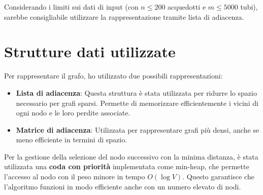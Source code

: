 \documentclass[a4paper,12pt]{article}
\begin{document}
Considerando i limiti sui dati di input (con $n \leq 200$ acquedotti e $m \leq 5000$ tubi), 
sarebbe consigliabile utilizzare la rappresentazione 
tramite lista di adiacenza.

\clearpage

\section{Strutture dati utilizzate}
Per rappresentare il grafo, ho utilizzato due possibili rappresentazioni:
\begin{itemize}
    \item \textbf{Lista di adiacenza}: Questa struttura è stata utilizzata per ridurre lo 
    spazio necessario per grafi sparsi. Permette di memorizzare efficientemente i vicini di 
    ogni nodo e le loro perdite associate.
    \item \textbf{Matrice di adiacenza}: Utilizzata per rappresentare grafi più densi, anche 
    se meno efficiente in termini di spazio.
\end{itemize}

Per la gestione della selezione del nodo successivo con la minima distanza, è stata 
utilizzata una \textbf{coda con priorità} implementata come min-heap, che permette 
l'accesso al nodo con il peso minore in tempo $O(\log V)$. Questo garantisce che 
l'algoritmo funzioni in modo efficiente anche con un numero elevato di nodi.
\end{document}

